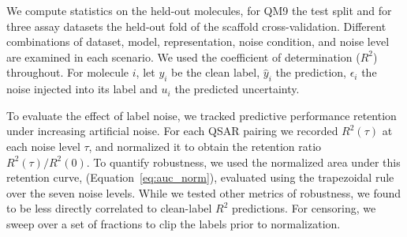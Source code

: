 We compute statistics on the held-out molecules, for QM9 the test split and for three assay datasets the held-out fold of the scaffold cross-validation. Different combinations of dataset, model, representation, noise condition, and noise level are examined in each scenario. We used the coefficient of determination ($R^2$) throughout. For molecule $i$, let $y_i$ be the clean label, $\hat{y}_i$ the prediction, $\epsilon_i$ the noise injected into its label and $u_i$ the predicted uncertainty.

To evaluate the effect of label noise, we tracked predictive performance retention under increasing artificial noise. For each QSAR pairing we recorded $R^2(\tau)$ at each noise level $\tau$, and normalized it to obtain the retention ratio $R^2(\tau)/R^2(0)$. To quantify robustness, we used the normalized area under this retention curve, \aucnorm (Equation~\ref{eq:auc_norm}), evaluated using the trapezoidal rule over the seven noise levels. While we tested other metrics of robustness, we found \aucnorm to be less directly correlated to clean-label $R^2$ predictions. For censoring, we sweep over a set of fractions to clip the labels prior to normalization. 


